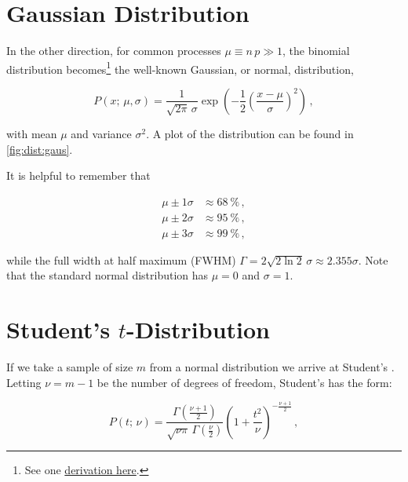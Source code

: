 \section{Gaussian Distribution}
\label{stats:gaus}

In the other direction, for common processes $\mu \equiv n\,p \gg 1$,
the binomial distribution becomes\footnote{See
one \href{http://scipp.ucsc.edu/~haber/ph116C/NormalApprox.pdf}{derivation here}.} the
well-known Gaussian, or normal, distribution,

\begin{equation}\label{eq:stats:gaus:P}
P\left(x;\,\mu,\sigma\right) = \frac{1}{\sqrt{2\pi}\,\sigma} \exp\left( -\frac{1}{2} \left(\frac{x-\mu}{\sigma}\right)^{2} \right)\,,
\end{equation}

\noindent with mean $\mu$ and variance $\sigma^{2}$.
A plot of the distribution can be found in \cref{fig:dist:gaus}.

It is helpful to remember that

\begin{equation}\label{eq:stats:gaus:sigmas}
\begin{split}
\mu \pm 1\sigma &\approx \SI{68}{\percent}\,, \\
\mu \pm 2\sigma &\approx \SI{95}{\percent}\,, \\
\mu \pm 3\sigma &\approx \SI{99}{\percent}\,,
\end{split}
\end{equation}

\noindent while the full width at half maximum (FWHM) $\Gamma = 2\sqrt{2 \ln{2}}\,\sigma \approx \num{2.355} \sigma$.
Note that the standard normal distribution has $\mu = 0$ and $\sigma =1$.

\section{Student's \texorpdfstring{$t$}{t}-Distribution}
\label{stats:t_dist}

If we take a sample of size $m$ from a normal distribution
we arrive at Student's \tdist.
Letting $\nu = m-1$ be the number of degrees of freedom,
Student's \tdist has the form:

\begin{equation}\label{eq:stats:t_dist:P}
P\left(t;\,\nu\right) = \frac{
\Gamma\left(\frac{\nu+1}{2}\right)
}{
\sqrt{\nu \pi}\,\Gamma\left(\frac{\nu}{2}\right)
} \left(1+\frac{t^{2}}{\nu}\right)^{-\frac{\nu+1}{2}}\,,
\end{equation}

